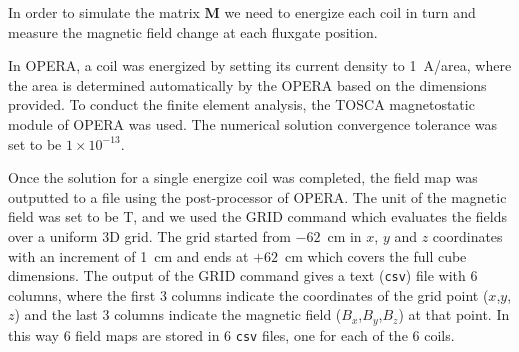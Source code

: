 In order to simulate the matrix $\bm{M}$ we need to energize each
coil in turn and measure the magnetic field change at each fluxgate
position.

In OPERA, a coil was energized by setting its current density to
1~A/area, where the area is determined automatically by the OPERA
based on the dimensions provided.  To conduct the finite element
analysis, the TOSCA magnetostatic module of OPERA was used.  The
numerical solution convergence tolerance was set to be $1\times10^{-13}$.

Once the solution for a single energize coil was completed, the field
map was outputted to a file using the post-processor of OPERA.
The unit of the magnetic field was set to be T, and we used the GRID
command which evaluates the fields over a uniform 3D grid. The grid
started from $-62$~cm in $x$, $y$ and $z$ coordinates with an
increment of 1~cm and ends at $+62$~cm which covers the full cube
dimensions.  The output of the GRID command gives a text ({\tt csv})
file with 6 columns, where the first 3 columns indicate the
coordinates of the grid point ($x$,$y$,$z$) and the last 3 columns
indicate the magnetic field ($B_x$,$B_y$,$B_z$) at that point.  In
this way 6 field maps are stored in 6 {\tt csv} files, one for each of
the 6 coils.





